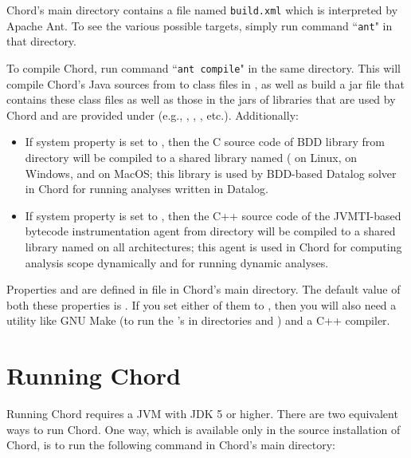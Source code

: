 Chord's main directory contains a file named {\tt build.xml} which is
interpreted by Apache Ant.  To see the various possible targets,
simply run command ``{\tt ant}" in that directory.

To compile Chord, run command ``{\tt ant compile}" in the same directory.
This will compile Chord's Java sources from  to class
files in , as well as build a jar file
 that contains these class files as well as those
in the jars of libraries that are used by Chord and are
provided under  (e.g., ,
, , etc.).  Additionally:

\begin{itemize}
\item

If system property  is set to , then
the C source code of BDD library
 from directory 
will be compiled to a shared library named
( on Linux,  on Windows, and
 on MacOS; this library is used by BDD-based
Datalog solver  in
Chord for running analyses written in Datalog.

\item

If system property  is set to , then
the C++ source code of the JVMTI-based bytecode instrumentation agent
from directory  will be compiled to a shared library named
 on all architectures;
this agent is used in Chord for computing analysis scope dynamically
and for running dynamic analyses.
\end{itemize}

Properties  and  are
defined in file  in Chord's main directory.
The default value of both these properties is .  If you set
either of them to , then you will also need a utility like
GNU Make (to run the 's in directories  and
) and a C++ compiler.

\section{Running Chord}
\label{sec:running-chord}

Running Chord requires a JVM with JDK 5 or higher.
There are two equivalent ways to run Chord.
One way, which is available only in the source installation of Chord, is to run the
following command in Chord's main directory:

